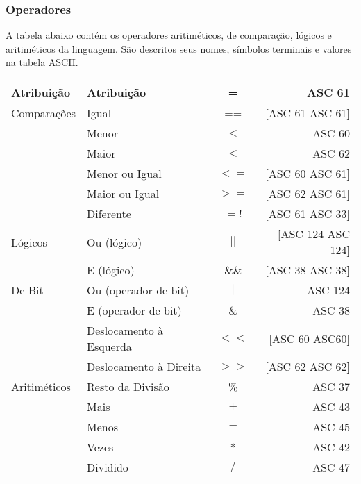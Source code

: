 \documentclass[a4paper,10pt]{article}
\begin{document}
    \subsubsection{Operadores}
    A tabela abaixo cont\'em os operadores aritim\'eticos, de compara\c{c}\~ao, l\'ogicos e aritim\'eticos da linguagem. S\~ao descritos seus nomes, s\'imbolos terminais e valores na tabela ASCII.
    \begin{center}
    \begin{tabular}{| l | l | c | r |}
      \hline
	    Atribui\c{c}\~ao & Atribui\c{c}\~{a}o & = & ASC 61 \\
	    \hline
	    Compara\c{c}\~oes & Igual & == & [ASC 61 ASC 61]\\
	    & Menor & $<$ & ASC 60 \\
	    & Maior & $<$ & ASC 62 \\
	    & Menor ou Igual & $<=$ & [ASC 60 ASC 61] \\
	    & Maior ou Igual & $>=$ & [ASC 62 ASC 61] \\
	    & Diferente & $=!$ & [ASC 61 ASC 33] \\
	    \hline
	    L\'ogicos& Ou (l\'ogico) & $||$ & [ASC 124 ASC 124] \\
	    & E (l\'ogico) & \&\& & [ASC 38 ASC 38] \\
	    \hline
	    De Bit & Ou (operador de bit) & $|$ & ASC 124\\
	    & E (operador de bit) & \& & ASC 38\\
	    & Deslocamento \`{a} Esquerda & $<<$ & [ASC 60 ASC60]\\
	    & Deslocamento \`{a} Direita & $>>$ & [ASC 62 ASC 62]\\
	    \hline
	    Aritim\'eticos& Resto da Divis\~ao & \% & ASC 37 \\
	    & Mais & $+$ & ASC 43 \\
	    & Menos & $-$ & ASC 45 \\
	    & Vezes & $*$ & ASC 42 \\
	    & Dividido & $/$ & ASC 47 \\
      \hline
    \end{tabular}
    \end{center}
\end{document}
